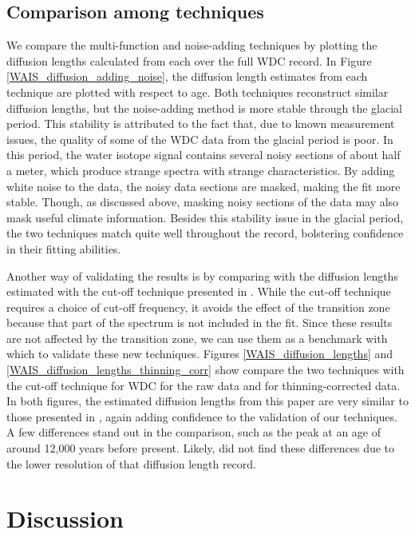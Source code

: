 \documentclass[draft, jgrga]{AGUTeX}
\begin{document}
\begin{article}
\subsection{Comparison among techniques}
We compare the multi-function and noise-adding techniques by plotting the diffusion lengths calculated from each over the full WDC record. In Figure \ref{WAIS_diffusion_adding_noise}, the diffusion length estimates from each technique are plotted with respect to age. Both techniques reconstruct similar diffusion lengths, but the noise-adding method is more stable through the glacial period. This stability is attributed to the fact that, due to known measurement issues, the quality of some of the WDC data from the glacial period is poor. In this period, the water isotope signal contains several noisy sections of about half a meter, which produce strange spectra with strange characteristics. By adding white noise to the data, the noisy data sections are masked, making the fit more stable. Though, as discussed above, masking noisy sections of the data may also mask useful climate information. Besides this stability issue in the glacial period, the two techniques match quite well throughout the record, bolstering confidence in their fitting abilities.

Another way of validating the results is by comparing with the diffusion lengths estimated with the cut-off technique presented in \cite{Jones2017a}. While the cut-off technique requires a choice of cut-off frequency, it avoids the effect of the transition zone because that part of the spectrum is not included in the fit. Since these results are not affected by the transition zone, we can use them as a benchmark with which to validate these new techniques. Figures \ref{WAIS_diffusion_lengths} and \ref{WAIS_diffusion_lengths_thinning_corr} show compare the two techniques with the cut-off technique for WDC for the raw data and for thinning-corrected data. In both figures, the estimated diffusion lengths from this paper are very similar to those presented in \cite{Jones2017a}, again adding confidence to the validation of our techniques. A few differences stand out in the comparison, such as the peak at an age of around 12,000 years before present. Likely, \cite{Jones2017a} did not find these differences due
to the lower resolution of that diffusion length record.


\section{Discussion}


\end{article}
\end{document}
